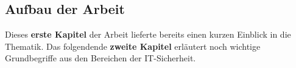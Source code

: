 
\subsection{Aufbau der Arbeit}


Dieses \textbf{erste Kapitel} der Arbeit lieferte bereits einen kurzen Einblick in die Thematik. Das folgendende \textbf{zweite Kapitel} erläutert noch wichtige Grundbegriffe aus den Bereichen der IT-Sicherheit.